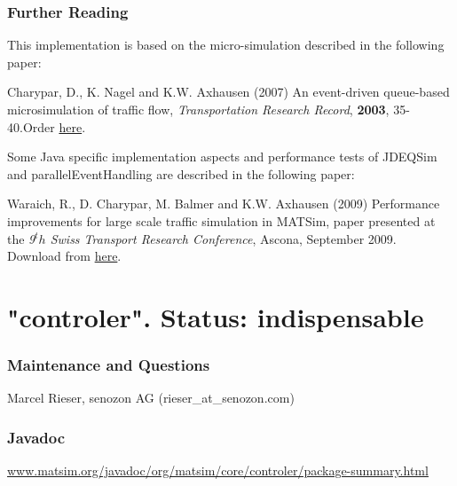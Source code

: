 \subsubsection{Further Reading}

This implementation is based on the micro-simulation described in the following paper:

Charypar, D., K. Nagel and K.W. Axhausen (2007) An event-driven queue-based microsimulation of traffic flow, \emph{Transportation Research Record}, \textbf{2003}, 35-40.Order \href{http://trb.metapress.com/content/j2118065485r4611/?p=4f63e25a261d48d99eeebea19b494e24&amp;pi=0}{here}.

Some  Java specific implementation aspects and performance tests of JDEQSim  and parallelEventHandling are described in the following paper:

Waraich,  R., D. Charypar, M. Balmer and K.W. Axhausen (2009) Performance  improvements for large scale traffic simulation in MATSim, paper  presented at the \emph{9$^th$ Swiss Transport Research Conference}, Ascona, September 2009. Download from \href{http://www.ivt.ethz.ch/vpl/publications/reports/ab565.pdf}{here}.


















\vfill\eject
\section{"controler". Status: indispensable}

\subsubsection{\textbf{Maintenance and Questions}}

Marcel Rieser, senozon AG (rieser\_at\_senozon.com)

\subsubsection{\textbf{Javadoc}}

\href{http://www.matsim.org/javadoc/org/matsim/core/controler/package-summary.html}{www.matsim.org/javadoc/org/matsim/core/controler/package-summary.html}



